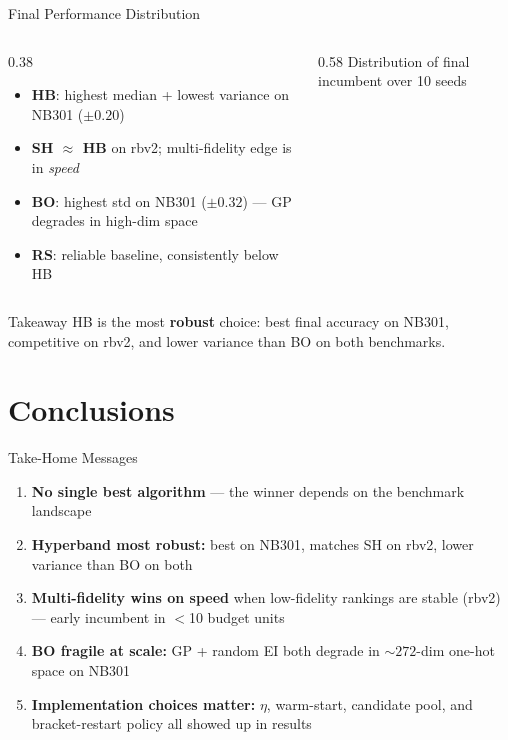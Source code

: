 \documentclass[t,english]{beamer}
\begin{document}
\begin{frame}{Final Performance Distribution}
  \begin{columns}[T]
    \begin{column}{0.38\textwidth}
      \begin{itemize}\setlength\itemsep{4pt}
        \item[\small$\blacktriangleright$] {\scriptsize\textbf{HB}: highest median + lowest variance on NB301 ($\pm 0.20$)}
        \item[\small$\blacktriangleright$] {\scriptsize\textbf{SH $\approx$ HB} on rbv2; multi-fidelity edge is in \emph{speed}}
        \item[\small$\blacktriangleright$] {\scriptsize\textbf{BO}: highest std on NB301 ($\pm 0.32$) — GP degrades in high-dim space}
        \item[\small$\blacktriangleright$] {\scriptsize\textbf{RS}: reliable baseline, consistently below HB}
      \end{itemize}
    \end{column}
    \begin{column}{0.58\textwidth}
      \vskip-8pt
      {\tiny Distribution of final incumbent over 10 seeds}
    \end{column}
  \end{columns}
  \vspace{0.3em}
  \begin{alertblock}{Takeaway}
    \small HB is the most \textbf{robust} choice: best final accuracy on NB301,
    competitive on rbv2, and lower variance than BO on both benchmarks.
  \end{alertblock}
\end{frame}

\section{Conclusions}

\begin{frame}{Take-Home Messages}
  \small
  \begin{enumerate}[<+->]\setlength\itemsep{5pt}
    \item \textbf{No single best algorithm} — the winner depends on the
          benchmark landscape
    \item \textbf{Hyperband most robust:} best on NB301, matches SH on rbv2,
          lower variance than BO on both
    \item \textbf{Multi-fidelity wins on speed} when low-fidelity rankings
          are stable (rbv2) — early incumbent in $<$10 budget units
    \item \textbf{BO fragile at scale:} GP + random EI both degrade in
          ${\sim}272$-dim one-hot space on NB301
    \item \textbf{Implementation choices matter:} $\eta$, warm-start,
          candidate pool, and bracket-restart policy all showed up in results
  \end{enumerate}
\end{frame}
\end{document}
